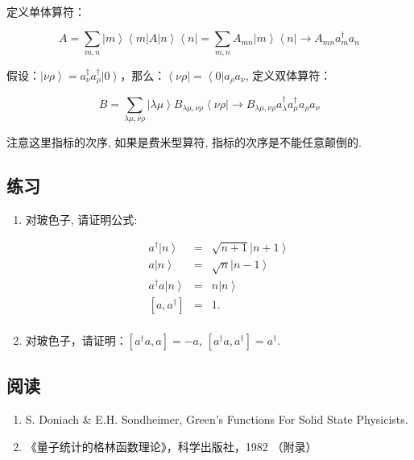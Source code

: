 定义单体算符：

\begin{equation}\label{one body operator}
A = \sum\limits_{m,n} {\left| m \right\rangle \left\langle m
\right|A\left| n \right\rangle \left\langle n \right|}  =
\sum\limits_{m,n} {A_{mn} \left| m \right\rangle \left\langle n
\right|}  \to A_{mn} a_m^\dag  a_n
\end{equation}

假设：$\left| {\nu \rho } \right\rangle  = a_\nu ^\dag  a_\rho ^\dag
\left| 0 \right\rangle $，那么：$\left\langle {\nu \rho } \right| =
\left\langle 0 \right|a_\rho  a_\nu $, 定义双体算符：

\begin{equation}\label{two body operator}
B = \sum\limits_{\lambda \mu ,\nu \rho } {\left| {\lambda \mu }
\right\rangle B_{\lambda \mu ,\nu \rho } \left\langle {\nu \rho }
\right|}  \to B_{\lambda \mu ,\nu \rho } a_\lambda ^\dag a_\mu ^\dag
a_\rho  a_\nu
\end{equation}

注意这里指标的次序, 如果是费米型算符, 指标的次序是不能任意颠倒的.

\subsection*{练习}

\begin{enumerate}

\item 

对玻色子, 请证明公式: 

\begin{eqnarray*}
a^\dagger \left| n \right\rangle & = & \sqrt{n+1} \left| n+1  \right\rangle  \\
a \left| n \right\rangle & = & \sqrt{n} \left| n-1 \right\rangle  \\
a^\dagger a \left| n \right\rangle & = & n \left| n \right\rangle \\
\left[ a, a^{\dagger} \right]  & = & 1 .\\
\end{eqnarray*}

\item 对玻色子，请证明：$[a^{\dag}a, a]=-a$, $[a^{\dag}a, a^{\dag}]=a^{\dag}$.

\end{enumerate}

\subsection*{阅读}

\begin{enumerate}
\item 

S. Doniach \& E.H. Sondheimer, Green's Functions For Solid State Physicists. 


\item

《量子统计的格林函数理论》，科学出版社，1982 （附录）

\end{enumerate}